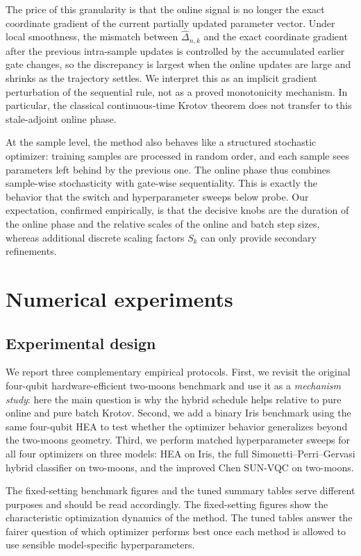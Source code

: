 \documentclass[aps,prb,10pt,twocolumn,superscriptaddress]{revtex4-2}
\begin{document}
The price of this granularity is that the online signal is no longer the exact coordinate gradient of the current partially updated parameter vector. Under local smoothness, the mismatch between \(\widehat{\Delta}_{n,k}\) and the exact coordinate gradient after the previous intra-sample updates is controlled by the accumulated earlier gate changes, so the discrepancy is largest when the online updates are large and shrinks as the trajectory settles. We interpret this as an implicit gradient perturbation of the sequential rule, not as a proved monotonicity mechanism. In particular, the classical continuous-time Krotov theorem does not transfer to this stale-adjoint online phase.

At the sample level, the method also behaves like a structured stochastic optimizer: training samples are processed in random order, and each sample sees parameters left behind by the previous one. The online phase thus combines sample-wise stochasticity with gate-wise sequentiality. This is exactly the behavior that the switch and hyperparameter sweeps below probe. Our expectation, confirmed empirically, is that the decisive knobs are the duration of the online phase and the relative scales of the online and batch step sizes, whereas additional discrete scaling factors \(S_k\) can only provide secondary refinements.

\section{Numerical experiments}

\subsection{Experimental design}

We report three complementary empirical protocols.
First, we revisit the original four-qubit hardware-efficient two-moons benchmark and use it as a \emph{mechanism study}: here the main question is why the hybrid schedule helps relative to pure online and pure batch Krotov.
Second, we add a binary Iris benchmark using the same four-qubit HEA to test whether the optimizer behavior generalizes beyond the two-moons geometry.
Third, we perform matched hyperparameter sweeps for all four optimizers on three models: HEA on Iris, the full Simonetti--Perri--Gervasi hybrid classifier on two-moons, and the improved Chen SUN-VQC on two-moons.

The fixed-setting benchmark figures and the tuned summary tables serve different purposes and should be read accordingly.
The fixed-setting figures show the characteristic optimization dynamics of the method.
The tuned tables answer the fairer question of which optimizer performs best once each method is allowed to use sensible model-specific hyperparameters.
\end{document}
